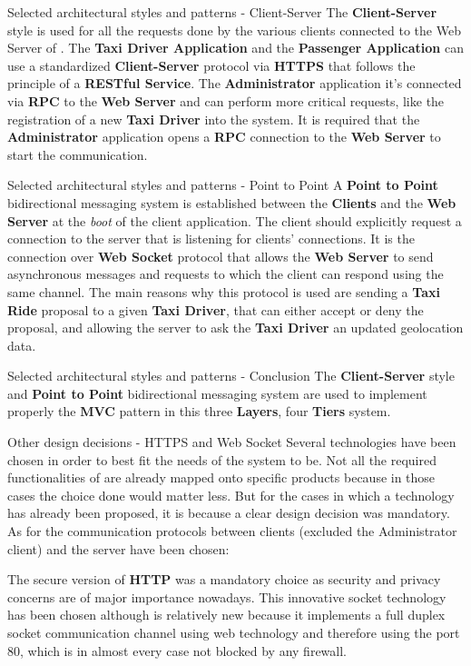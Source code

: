 \documentclass{../common/latex_classes/pdf_presentation}
\begin{document}
	\begin{frame}{Selected architectural styles and patterns - Client-Server}
		The \textbf{Client-Server} style is used for all the requests done by the various clients connected to the Web Server of \myTaxiService{}.
		The \textbf{Taxi Driver Application} and the \textbf{Passenger Application} can use a standardized \textbf{Client-Server} protocol via \textbf{HTTPS} that follows the principle of a \textbf{RESTful Service}.
		The \textbf{Administrator} application it's connected via \textbf{RPC} to the \textbf{Web Server} and can perform more critical requests, like the registration of a new \textbf{Taxi Driver} into the system.
		It is required that the \textbf{Administrator} application opens a \textbf{RPC} connection to the \textbf{Web Server} to start the communication.
	\end{frame}
	\begin{frame}{Selected architectural styles and patterns - Point to Point}
		A \textbf{Point to Point} bidirectional messaging system is established between the \textbf{Clients} and the \textbf{Web Server} at the \textit{boot} of the client application.
		The client should explicitly request a connection to the server that is listening for clients' connections.
		It is the connection over \textbf{Web Socket} protocol that allows the \textbf{Web Server} to send asynchronous messages and requests to which the client can respond using the same channel.
		The main reasons why this protocol is used are sending a \textbf{Taxi Ride} proposal to a given \textbf{Taxi Driver}, that can either accept or deny the proposal, and allowing the server to ask the \textbf{Taxi Driver} an updated geolocation data.
	\end{frame}
	\begin{frame}{Selected architectural styles and patterns - Conclusion}
		The \textbf{Client-Server} style and \textbf{Point to Point} bidirectional messaging system are used to implement properly the \textbf{MVC} pattern in this three \textbf{Layers}, four \textbf{Tiers} system.
	\end{frame}
	\begin{frame}{Other design decisions - HTTPS and Web Socket}
		Several technologies have been chosen in order to best fit the needs of the system to be.
		Not all the required functionalities of \myTaxiService{} are already mapped onto specific products because in those cases the choice done would matter less.
		But for the cases in which a technology has already been proposed, it is because a clear design decision was mandatory.
		As for the communication protocols between clients (excluded the Administrator client) and the server have been chosen:
		\begin{itemize}
			 The secure version of \textbf{HTTP} was a mandatory choice as security and privacy concerns are of major importance nowadays.
			 This innovative socket technology has been chosen although is relatively new because it implements a full duplex socket communication channel using web technology and therefore using the port 80, which is in almost every case not blocked by any firewall.
		\end{itemize}
	\end{frame}
\end{document}
